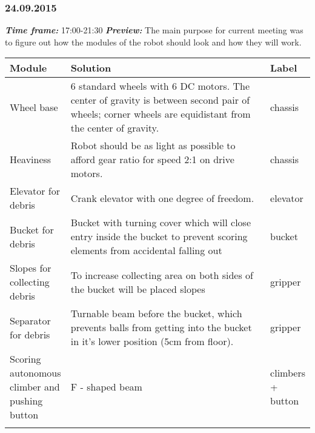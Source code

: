 \subsubsection{24.09.2015}
	\textit{\textbf{Time frame:}} 17:00-21:30 \newline
	\textit{\textbf{Preview:}} The main purpose for current meeting was to figure out how the modules of the robot should look and how they will work. \newline \newline

  \begin{table}[H]
	\vspace{-2mm}
	\begin{center}
		\begin{tabular}{|p{0.2\linewidth}|p{0.7\linewidth}|p{0.1\linewidth}|}
			\hline
			Module & Solution & Label \\
			\hline
			Wheel base & 6 standard wheels with 6 DC motors. The center of gravity is between second pair of wheels; corner wheels are equidistant from the center of gravity. & chassis \\
			\hline
			Heaviness & Robot should be as light as possible to afford gear ratio for speed 2:1 on drive motors. & chassis \\
			\hline
			Elevator for debris & Crank elevator with one degree of freedom. & elevator \\
			\hline
			Bucket for debris & Bucket with turning cover which will close entry inside the bucket to prevent scoring elements from accidental falling out & bucket \\
			\hline
			Slopes for collecting debris & To increase collecting area on both sides of the bucket will be placed slopes & gripper \\
			\hline
			Separator for debris & Turnable beam before the bucket, which prevents balls from getting into the bucket in it's lower position (5cm from floor). & gripper \\
			\hline
			Scoring autonomous climber and pushing button & F - shaped beam & climbers + button\\ \\
			\hline
		\end{tabular}
	\end{center}
  \end{table}
  
